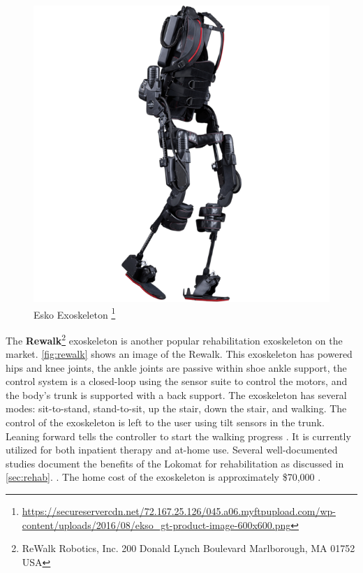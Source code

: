 \begin{figure}
    \centering
    \includegraphics[scale=0.38]{images/background/ekso.png}
    \caption[Esko Exoskeleton]{Esko Exoskeleton \protect\footnote{\url{https://secureservercdn.net/72.167.25.126/045.a06.myftpupload.com/wp-content/uploads/2016/08/ekso_gt-product-image-600x600.png}}}
    \label{fig:esko}
\end{figure}


The \textbf{Rewalk}\footnote{ReWalk Robotics, Inc.
200 Donald Lynch Boulevard Marlborough, MA 01752
USA} exoskeleton is another popular rehabilitation exoskeleton on the market. \autoref{fig:rewalk} shows an image of the Rewalk. This exoskeleton has powered hips and knee joints,  the ankle joints are passive within shoe ankle support,  the control system is a closed-loop using the sensor suite to control the motors, and the body's trunk is supported with a back support. The exoskeleton has several modes: sit-to-stand, stand-to-sit, up the stair, down the stair, and walking. The control of the exoskeleton is left to the user using tilt sensors in the trunk. Leaning forward tells the controller to start the walking progress  \cite{zeilig2012safety}. It is currently utilized for both inpatient therapy and at-home use. Several well-documented studies document the benefits of the Lokomat for rehabilitation as discussed in \autoref{sec:rehab}. \cite{esquenazi2012rewalk}. The home cost of the exoskeleton is approximately \$70,000 \cite{wolff2014survey}. 


